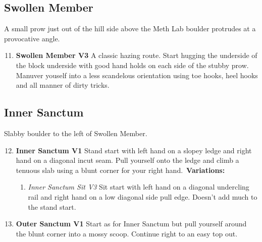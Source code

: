 \subsection*{Swollen Member}\label{bf:Swollen Member}
A small prow just out of the hill side above the Meth Lab boulder protrudes at a provocative angle.

\begin{enumerate}[]
	\setcounter{enumi}{10}
	\item\label{rt:Swollen Member} \colorbox{green!20}{\textbf{Swollen Member V3    } }
	\newline A classic hazing route. Start hugging the underside of the block underside with good hand holds on each side of the stubby prow. Manuver youself into a less scandelous orientation using toe hooks, heel hooks and  all manner of dirty tricks.\
\end{enumerate}
\subsection*{Inner Sanctum}\label{bf:Inner Sanctum}
Slabby boulder to the left of Swollen Member.

\begin{enumerate}[]
	\setcounter{enumi}{11}
	\item\label{rt:Inner Sanctum} \colorbox{green!20}{\textbf{Inner Sanctum V1    \warn } }
	\newline Stand start with left hand on a slopey ledge and right hand on a diagonal incut seam. Pull yourself onto the ledge and climb a tenuous slab using a blunt corner for your right hand.\
	\newline \textbf{Variations:}
	\begin{enumerate}
		\item\label{vr:Inner Sanctum Sit} \colorbox{green!20}{\emph{Inner Sanctum Sit V3   }  }
		\newline Sit start with left hand on a diagonal undercling rail and right hand on a low diagonal side pull edge. Doesn't add much to the stand start.\
	\end{enumerate}
	\setcounter{enumi}{12}
	\item\label{rt:Outer Sanctum} \colorbox{green!20}{\textbf{Outer Sanctum V1 \ding{72}  } }
	\newline Start as for Inner Sanctum but pull yourself around the blunt corner into a mossy scoop. Continue right to an easy top out.\
\end{enumerate}
